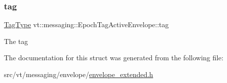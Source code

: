 \subsubsection{\texorpdfstring{tag}{tag}}
{\footnotesize\ttfamily \hyperlink{namespacevt_a84ab281dae04a52a4b243d6bf62d0e52}{Tag\+Type} vt\+::messaging\+::\+Epoch\+Tag\+Active\+Envelope\+::tag}

The tag 

The documentation for this struct was generated from the following file\+:\begin{DoxyCompactItemize}
\item 
src/vt/messaging/envelope/\hyperlink{envelope__extended_8h}{envelope\+\_\+extended.\+h}\end{DoxyCompactItemize}
